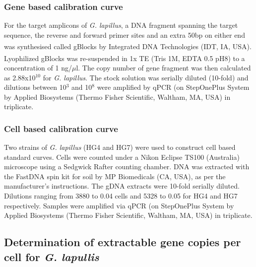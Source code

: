 \documentclass[12pt]{article}
\begin{document}
\subsubsection*{Gene based calibration curve}
For the target amplicons of \emph{G. lapillus}, a DNA fragment spanning the target sequence, the reverse and forward primer sites and an extra 50bp on either end was synthesised called gBlocks \textsuperscript{\textregistered} by Integrated DNA Technologies (IDT, IA, USA). %
Lyophilized gBlocks \textsuperscript{\textregistered} was re-suspended in 1x TE (Tris 1M, EDTA 0.5 pH8) to a concentration of 1 ng/$\mu$l. 
The copy number of gene fragment was then calculated as 2.88x10$^{10}$ 
for \textit{G. lapillus}. 
The stock solution was serially diluted (10-fold) and dilutions between 10$^{3}$ and 10$^{8}$ were amplified by qPCR 
(on StepOnePlus System by Applied Biosystems (Thermo Fisher Scientific, Waltham, MA, USA) in triplicate.


\subsubsection*{Cell based calibration curve}
Two strains of \emph{G. lapillus} (HG4 and HG7) 
were used to construct cell based standard curves. 
Cells were counted under a Nikon Eclipse TS100 (Australia) microscope using a Sedgwick Rafter counting chamber. 
DNA was extracted with the FastDNA spin kit for soil by MP Biomedicals (CA, USA), as per the manufacturer's instructions. 
The gDNA extracts were 10-fold serially diluted. 
Dilutions ranging from 3880 to 0.04 cells and 5328 to 0.05 for HG4 and HG7 respectively.  
Samples were amplified via qPCR (on StepOnePlus System by Applied Biosystems (Thermo Fisher Scientific, Waltham, MA, USA) %
in triplicate.

\subsection*{Determination of extractable gene copies per cell for \emph{G. lapullis}}%
\end{document}
